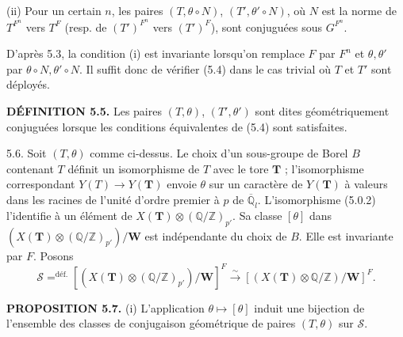 \documentclass[9pt,twoside]{extarticle}
\begin{document}
{(ii) Pour un certain \(n\), les paires \((T,\theta\circ N)\), \((T',\theta'\circ N)\), où \(N\) est la norme de \(T^{F^n}\) vers \(T^F\) (resp. de \((T')^{F^n}\) vers \((T')^F\)), sont conjuguées sous \(G^{F^n}\).\par

D'après 5.3, la condition (i) est invariante lorsqu'on remplace \(F\) par \(F^n\) et \(\theta,\theta'\) par \(\theta\circ N,\theta'\circ N\). Il suffit donc de vérifier (5.4) dans le cas trivial où \(T\) et \(T'\) sont déployés.\par

\noindent\textbf{DÉFINITION 5.5.} Les paires \((T,\theta)\), \((T',\theta')\) sont dites géométriquement conjuguées lorsque les conditions équivalentes de (5.4) sont satisfaites.\par

5.6. Soit \((T,\theta)\) comme ci-dessus. Le choix d'un sous-groupe de Borel \(B\) contenant \(T\) définit un isomorphisme de \(T\) avec le tore \(\mathbf T\) ; l'isomorphisme correspondant \(Y(T)\to Y(\mathbf T)\) envoie \(\theta\) sur un caractère de \(Y(\mathbf T)\) à valeurs dans les racines de l'unité d'ordre premier à \(p\) de \(\overline{\mathbb Q}_l\). L'isomorphisme (5.0.2) l'identifie à un élément de \(X(\mathbf T)\otimes(\mathbb Q/\mathbb Z)_{p'}\). Sa classe \([\theta]\) dans \((X(\mathbf T)\otimes(\mathbb Q/\mathbb Z)_{p'})/\mathbf W\) est indépendante du choix de \(B\). Elle est invariante par \(F\). Posons \[
\mathcal S\mathrel{\mathop{=}^{\mathrm{déf.}}}
[(X(\mathbf T)\otimes(\mathbb Q/\mathbb Z)_{p'})/\mathbf W]^F
\xrightarrow{\sim}
[(X(\mathbf T)\otimes\mathbb Q/\mathbb Z)/\mathbf W]^F.
\]\par

\noindent\textbf{PROPOSITION 5.7.} (i) L'application \(\theta\mapsto[\theta]\) induit une bijection de l'ensemble des classes de conjugaison géométrique de paires \((T,\theta)\) sur \(\mathcal S\).\par
}
\end{document}
